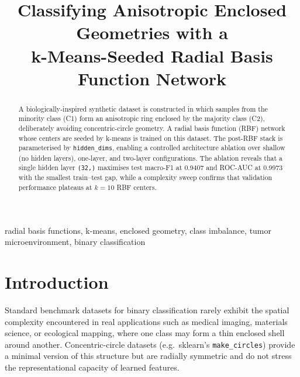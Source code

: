 \documentclass[conference]{IEEEtran}
\begin{document}
\title{Classifying Anisotropic Enclosed Geometries with a\\
       k-Means-Seeded Radial Basis Function Network}

\author{%
}

\maketitle

\begin{abstract}
A biologically-inspired synthetic dataset is constructed in which samples from
the minority class (C1) form an anisotropic ring enclosed by the majority
class (C2), deliberately avoiding concentric-circle geometry.
A radial basis function (RBF) network whose centers are seeded by k-means is
trained on this dataset.
The post-RBF stack is parameterised by \texttt{hidden\_dims}, enabling a
controlled architecture ablation over shallow (no hidden layers), one-layer,
and two-layer configurations.
The ablation reveals that a single hidden layer \texttt{(32,)} maximises
test macro-F1 at 0.9407 and ROC-AUC at 0.9973 with the smallest
train--test gap, while a complexity sweep confirms that validation
performance plateaus at $k{=}10$ RBF centers.
\end{abstract}

\begin{IEEEkeywords}
radial basis functions, k-means, enclosed geometry, class imbalance,
tumor microenvironment, binary classification
\end{IEEEkeywords}

\section{Introduction}
\label{sec:intro}

Standard benchmark datasets for binary classification rarely exhibit the
spatial complexity encountered in real applications such as medical imaging,
materials science, or ecological mapping, where one class may form a thin
enclosed shell around another.  Concentric-circle datasets (e.g.\
sklearn's \texttt{make\_circles}) provide a minimal version of this
structure but are radially symmetric and do not stress the representational
capacity of learned features.
\end{document}
